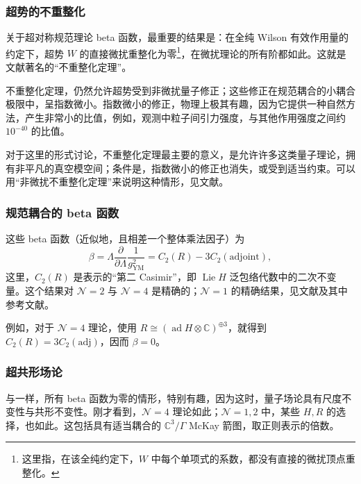 \subsubsection{超势的不重整化}\label{sec:5.4.6.3}

关于超对称规范理论 beta 函数，最重要的结果是：在全纯 Wilson 有效作用量的约定下，超势 $W$ 的直接微扰重整化为零\footnote{这里指，在该全纯约定下，$W$ 中每个单项式的系数，都没有直接的微扰顶点重整化。}，在微扰理论的所有阶都如此。这就是文献著名的“不重整化定理”。

不重整化定理，仍然允许超势受到非微扰量子修正；这些修正在规范耦合的小耦合极限中，呈指数微小。指数微小的修正，物理上极其有趣，因为它提供一种自然方法，产生非常小的比值，例如，观测中粒子间引力强度，与其他作用强度之间约 $10^{-40}$ 的比值。

对于这里的形式讨论，不重整化定理最主要的意义，是允许许多这类量子理论，拥有非平凡的真空模空间；条件是，指数微小的修正也消失，或受到适当约束。可以用“非微扰不重整化定理”来说明这种情形，见文献。

\subsubsection{规范耦合的 beta 函数}\label{sec:5.4.6.4}

这些 beta 函数（近似地，且相差一个整体乘法因子）为
\begin{equation}\label{eq:5.123}
\beta=\Lambda\frac{\partial}{\partial\Lambda}\frac{1}{g_{\mathrm{YM}}^2}
=C_2(R)-3C_2(\mathrm{adjoint}),
\end{equation}
这里，$C_2(R)$ 是表示的“第二 Casimir”，即 $\operatorname{Lie}H$ 泛包络代数中的二次不变量。这个结果对 $\mathcal{N}=2$ 与 $\mathcal{N}=4$ 是精确的；$\mathcal{N}=1$ 的精确结果，见文献及其中参考文献。

例如，对于 $\mathcal{N}=4$ 理论，使用 $R\cong(\operatorname{ad}H\otimes\mathbb{C})^{\oplus3}$，就得到 $C_2(R)=3C_2(\mathrm{adj})$，因而 $\beta=0$。

\subsubsection{超共形场论}\label{sec:5.4.6.5}

与一样，所有 beta 函数为零的情形，特别有趣，因为这时，量子场论具有尺度不变性与共形不变性。刚才看到，$\mathcal{N}=4$ 理论如此；$\mathcal{N}=1,2$ 中，某些 $H,R$ 的选择，也如此。这包括具有适当耦合的 $\mathbb{C}^3/\Gamma$ McKay 箭图，取正则表示的倍数。

